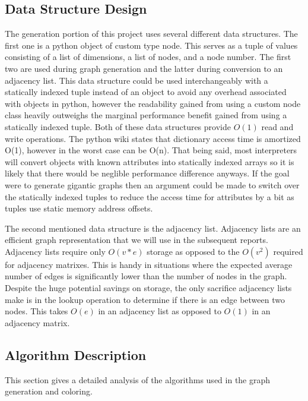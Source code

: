 \documentclass{article}
\begin{document}
	\subsection{Data Structure Design}
		The generation portion of this project uses several different data structures.
		The first one is a python object of custom type node.
		This serves as a tuple of values consisting of a list of dimensions, a list of nodes, and a node number.
		The first two are used during graph generation and the latter during conversion to an adjacency list.
		This data structure could be used interchangeably with a statically indexed tuple instead of an object to avoid any overhead associated with objects in python, however the readability gained from using a custom node class heavily outweighs the marginal performance benefit gained from using a statically indexed tuple.
		Both of these data structures provide $O(1)$ read and write operations.
    The python wiki states that dictionary access time is amortized O(1), however in the worst case can be O(n)\cite{pythonwikiruntimes}.
    That being said, most interpreters will convert objects with known attributes into statically indexed arrays so it is likely that there would be neglible performance difference anyways.
		If the goal were to generate gigantic graphs then an argument could be made to switch over the statically indexed tuples to reduce the access time for attributes by a bit as tuples use static memory address offsets.

		The second mentioned data structure is the adjacency list.
		Adjacency lists are an efficient graph representation that we will use in the subsequent reports.
		Adjacency lists require only $O(v*e)$ storage as opposed to the $O(v^2)$ required for adjacency matrixes.
		This is handy in situations where the expected average number of edges is significantly lower than the number of nodes in the graph.
		Despite the huge potential savings on storage, the only sacrifice adjacency lists make is in the lookup operation to determine if there is an edge between two nodes.
		This takes $O(e)$ in an adjacency list as opposed to $O(1)$ in an adjacency matrix.

	\subsection{Algorithm Description}
		This section gives a detailed analysis of the algorithms used in the graph generation and coloring.
\end{document}
